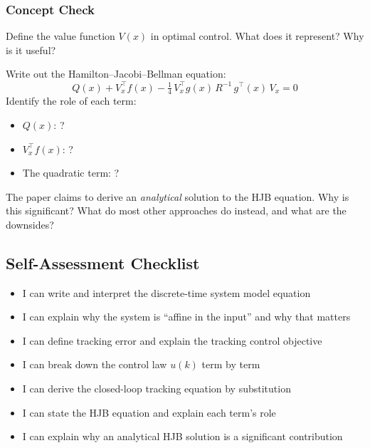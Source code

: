 \subsubsection*{Concept Check}

Define the value function $V(x)$ in optimal control. What does it represent? Why is it useful?

\begin{answerbox}\end{answerbox}

Write out the Hamilton--Jacobi--Bellman equation:
\[
  Q(x) + V_x^\top f(x) - \tfrac{1}{4}\,V_x^\top g(x)\,R^{-1}\,g^\top(x)\,V_x = 0
\]
Identify the role of each term:
\begin{itemize}[nosep]
  \item $Q(x)$: ?
  \item $V_x^\top f(x)$: ?
  \item The quadratic term: ?
\end{itemize}

\begin{answerbox}\end{answerbox}

The paper claims to derive an \emph{analytical} solution to the HJB equation. Why is this significant? What do most other approaches do instead, and what are the downsides?

\begin{answerbox}\end{answerbox}

\subsection*{Self-Assessment Checklist}

\begin{itemize}[leftmargin=2em, label=$\square$]
  \item I can write and interpret the discrete-time system model equation
  \item I can explain why the system is ``affine in the input'' and why that matters
  \item I can define tracking error and explain the tracking control objective
  \item I can break down the control law $u(k)$ term by term
  \item I can derive the closed-loop tracking equation by substitution
  \item I can state the HJB equation and explain each term's role
  \item I can explain why an analytical HJB solution is a significant contribution
\end{itemize}

\begin{notesbox}\end{notesbox}
